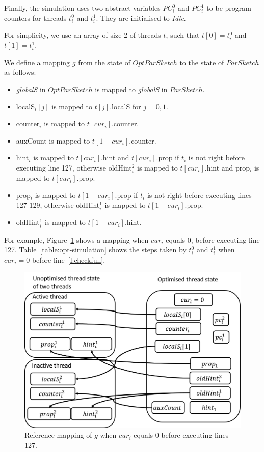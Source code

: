 Finally, the simulation uses two abstract variables $PC_i^0$ and $PC_i^1$ to be
program counters for threads $t_i^0$ and $t_i^1$. They are initialised to \emph{Idle}.

For simplicity, we use an array of size 2 of threads $t$, such that $t[0]=t_i^0$ and $t[1]=t_i^1$.

We define a mapping $g$ from the state of $OptParSketch$ to the state of $ParSketch$ as follows:
\begin{itemize}
    \item \emph{globalS} in $OptParSketch$ is mapped to \emph{globalS} in $ParSketch$.
    \item localS$_i[j]$ is mapped to $t[j]$.localS for $j=0,1$.
    \item counter$_i$ is mapped to $t[cur_i]$.counter.
    \item auxCount is mapped to $t[1-cur_i]$.counter.
    \item hint$_i$ is mapped to $t[cur_i]$.hint and $t[cur_i]$.prop if $t_i$ is not right before executing line 127,
    otherwise oldHint$_i^2$ is mapped to $t[cur_i]$.hint and prop$_i$ is mapped to $t[cur_i]$.prop.
    \item prop$_i$ is mapped to $t[1-cur_i]$.prop if $t_i$ is not right before executing lines 127-129,
    otherwise oldHint$_i^1$ is mapped to $t[1-cur_i]$.prop.
    \item oldHint$_i^1$ is mapped to $t[1-cur_i]$.hint.
\end{itemize}

For example, Figure~\ref{fig:optConcurrentMap} shows a mapping when $cur_i$ equals 0, before executing
line 127. Table~\ref{table:opt-simulation} shows the steps taken by $t_i^0$ and $t_i^1$ when
$cur_i=0$ before line~\ref{l:checkfull}.

\begin{figure}[h]
    \centering
    \includegraphics[width=5in]{images/optConcurrentMap.png}
    \caption{Reference mapping of $g$ when $cur_i$ equals 0 before executing lines 127.}
    \label{fig:optConcurrentMap}
\end{figure}


